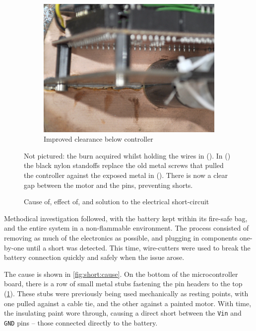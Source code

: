 \documentclass[main.tex]{subfiles}
\begin{document}
\begin{figure}[b]
\begin{subfigure}[t]{\linewidth/3 - 1em}
			\includegraphics[width=\linewidth]{figures/standoffs.jpg}
			\caption{Improved clearance below controller}
			\label{fig:clearance}
		\end{subfigure}
		\caption{Cause of, effect of, and solution to the electrical short-circuit}
		\label{fig:short}
		\medskip
		\small
		Not pictured: the burn acquired whilst holding the wires in ().
		In () the black nylon standoffs replace the old metal screws that pulled the controller against the exposed metal in ().
		There is now a clear gap between the motor and the pins, preventing shorts.
	\end{figure}

	Methodical investigation followed, with the battery kept within its fire-safe bag, and the entire system in a non-flammable environment. The process consisted of removing as much of the electronics as possible, and plugging in components one-by-one until a short was detected. This time, wire-cutters were used to break the battery connection quickly and safely when the issue arose.

	The cause is shown in \cref{fig:short:cause}. On the bottom of the microcontroller board, there is a row of small metal stubs fastening the pin headers to the top (\cref{fig:clearance}). These stubs were previously being used mechanically as resting points, with one pulled against a cable tie, and the other against a painted motor. With time, the insulating paint wore through, causing a direct short between the \texttt{Vin} and \texttt{GND} pins -- those connected directly to the battery.
\end{document}
